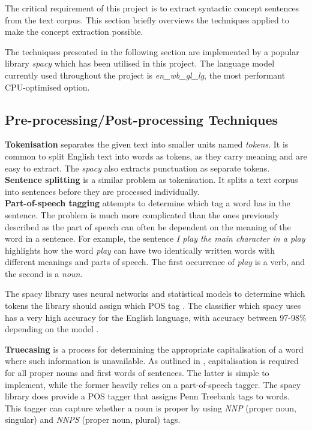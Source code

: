 The critical requirement of this project is to extract syntactic concept sentences from the text corpus.
This section briefly overviews the techniques applied to make the concept extraction possible.

The techniques presented in the following section are implemented by a popular library \emph{spacy} \cite{RefWorks:RefID:24-spacy} which has been utilised in this project. 
The language model currently used throughout the project is \emph{en\_wb\_gl\_lg}, the most performant CPU-optimised option.

\subsection{Pre-processing/Post-processing Techniques}
\label{nlp-processing-techniques}

\textbf{Tokenisation} separates the given text into smaller units named \emph{tokens}. 
It is common to split English text into words as tokens, as they carry meaning and are easy to extract.
The \emph{spacy} also extracts punctuation as separate tokens. \\

\textbf{Sentence splitting} is a similar problem as tokenisation. It splits a text corpus into sentences before they are processed individually. \\

\textbf{Part-of-speech tagging} attempts to determine which tag a word has in the sentence.
The problem is much more complicated than the ones previously described as the part of speech can often be dependent on the meaning of the word in a sentence.
For example, the sentence \emph{I play the main character in a play} highlights how the word \emph{play} can have two identically written words with different meanings and parts of speech.
The first occurrence of \emph{play} is a verb, and the second is a \emph{noun}.

The spacy library uses neural networks and statistical models to determine which tokens the library should assign which POS tag \cite{RefWorks:RefID:25-spacy}.
The classifier which spacy uses has a very high accuracy for the English language, with accuracy between 97-98\% depending on the model \cite{RefWorks:RefID:26-spacy}.

\textbf{Truecasing} \cite{RefWorks:RefID:81-lita2003truecasing} is a process for determining the appropriate capitalisation of a word where such information is unavailable. 
As outlined in \cite{RefWorks:RefID:91-luo2020capitalization}, capitalisation is required for all proper nouns and first words of sentences. 
The latter is simple to implement, while the former heavily relies on a part-of-speech tagger. 
The spacy library does provide a POS tagger that assigns Penn Treebank \cite{RefWorks:RefID:29-mrini2019rethinking} tags to words.
This tagger can capture whether a noun is proper by using \textit{NNP} (proper noun, singular) and \textit{NNPS} (proper noun, plural) tags.


